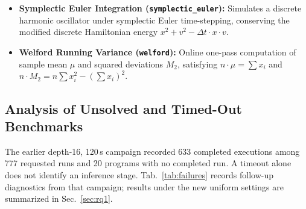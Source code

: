 \documentclass[runningheads]{llncs}
\newcommand{\code}[1]{\texttt{\small #1}}
\begin{document}
\begin{itemize}[leftmargin=1.5em,itemsep=2pt]
\item \textbf{Symplectic Euler Integration (\code{symplectic\_euler}):} Simulates a discrete harmonic oscillator under symplectic Euler time-stepping, conserving the modified discrete Hamiltonian energy $x^2 + v^2 - \Delta t \cdot x \cdot v$.
\item \textbf{Welford Running Variance (\code{welford}):} Online one-pass computation of sample mean $\mu$ and squared deviations $M_2$, satisfying $n \cdot \mu = \sum x_i$ and $n \cdot M_2 = n \sum x_i^2 - (\sum x_i)^2$.
\end{itemize}

\subsection{Analysis of Unsolved and Timed-Out Benchmarks}
\label{sec:appendix_failures}
The earlier depth-16, 120\,s campaign recorded 633 completed executions among 777 requested runs and 20 programs with no completed run. A timeout alone does not identify an inference stage. Tab.~\ref{tab:failures} records follow-up diagnostics from that campaign; results under the new uniform settings are summarized in Sec.~\ref{sec:rq1}.
\end{document}
